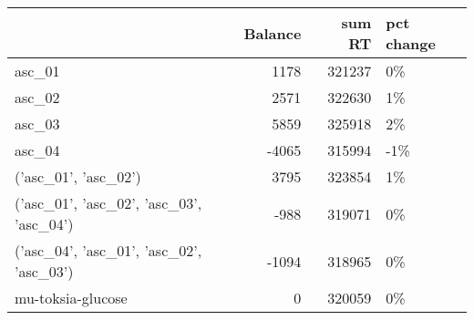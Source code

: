 \begin{tabular}{lrrl}
\toprule
{} &  Balance &  sum RT & pct change \\
\midrule
asc\_01                                   &     1178 &  321237 &         0\% \\
asc\_02                                   &     2571 &  322630 &         1\% \\
asc\_03                                   &     5859 &  325918 &         2\% \\
asc\_04                                   &    -4065 &  315994 &        -1\% \\
('asc\_01', 'asc\_02')                     &     3795 &  323854 &         1\% \\
('asc\_01', 'asc\_02', 'asc\_03', 'asc\_04') &     -988 &  319071 &         0\% \\
('asc\_04', 'asc\_01', 'asc\_02', 'asc\_03') &    -1094 &  318965 &         0\% \\
mu-toksia-glucose                        &        0 &  320059 &         0\% \\
\bottomrule
\end{tabular}
